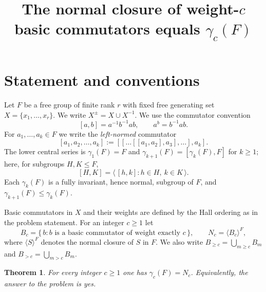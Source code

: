 \documentclass{amsart}
\newtheorem{theorem}{Theorem}
\theoremstyle{definition}
\theoremstyle{remark}
\begin{document}
\title{The normal closure of weight-$c$ basic commutators equals $\gamma_c(F)$}
\maketitle

\section{Statement and conventions}

Let $F$ be a free group of finite rank $r$ with fixed free generating set
$X=\{x_1,\dots,x_r\}$. We write $X^{\pm}=X\cup X^{-1}$. We use the commutator
convention
\[
[a,b]=a^{-1}b^{-1}ab ,\qquad a^{b}=b^{-1}ab .
\]
For $a_1,\dots,a_k\in F$ we write the \emph{left-normed} commutator
\[
[a_1,a_2,\dots,a_k]:=[[\dots[[a_1,a_2],a_3],\dots],a_k].
\]
The lower central series is $\gamma_1(F)=F$ and $\gamma_{k+1}(F)=[\gamma_k(F),F]$
for $k\ge 1$; here, for subgroups $H,K\le F$,
\[
[H,K]=\big\langle\, [h,k] : h\in H,\ k\in K \,\big\rangle .
\]
Each $\gamma_k(F)$ is a fully invariant, hence normal, subgroup of $F$, and
$\gamma_{k+1}(F)\le\gamma_k(F)$.

Basic commutators in $X$ and their weights are defined by the Hall ordering as in
the problem statement. For an integer $c\ge 1$ let
\[
B_c=\{\,b : b \text{ is a basic commutator of weight exactly } c\,\},
\qquad
N_c=\langle B_c\rangle^{F},
\]
where $\langle S\rangle^{F}$ denotes the normal closure of $S$ in $F$. We also
write $B_{\ge c}=\bigcup_{m\ge c}B_m$ and $B_{>c}=\bigcup_{m>c}B_m$.

\begin{theorem}\label{thm:main}
For every integer $c\ge 1$ one has $\gamma_c(F)=N_c$. Equivalently, the answer to
the problem is \emph{yes}.
\end{theorem}
\end{document}
